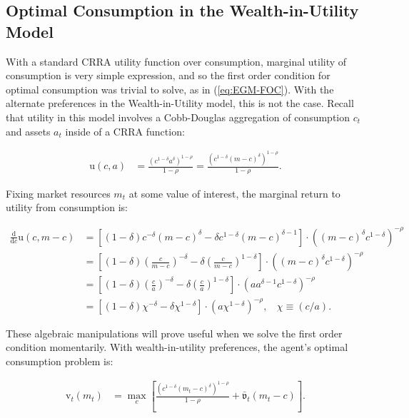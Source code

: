 \documentclass[12pt,letterpaper, fleqn]{article}
\newcommand{\CRRA}{\rho}
\newcommand{\uFunc}{\mathrm{u}}
\newcommand{\vFunc}{\mathrm{v}}
\newcommand{\cNrm}{c}
\newcommand{\mNrm}{m}
\newcommand{\aNrm}{a}
\begin{document}
\subsection{Optimal Consumption in the Wealth-in-Utility Model}

With a standard CRRA utility function over consumption, marginal utility of consumption is very simple expression, and so the first order condition for optimal consumption was trivial to solve, as in (\ref{eq:EGM-FOC}). With the alternate preferences in the Wealth-in-Utility model, this is not the case. Recall that utility in this model involves a Cobb-Douglas aggregation of consumption $\cNrm_t$ and assets $\aNrm_t$ inside of a CRRA function:

\begin{align}
    \uFunc(\cNrm, \aNrm) & = \frac{\left(\cNrm^{1-\delta}\aNrm^{\delta}\right)^{1-\CRRA}}{1-\CRRA} = \frac{\left(\cNrm^{1-\delta}(\mNrm - \cNrm)^{\delta}\right)^{1-\CRRA}}{1-\CRRA}.
\end{align}

Fixing market resources $\mNrm_t$ at some value of interest, the marginal return to utility from consumption is:

\begin{align}
\frac{\text{d}}{\text{d} \cNrm} \uFunc(\cNrm, \mNrm-\cNrm) &= \left[ (1-\delta) \cNrm^{-\delta} (\mNrm - \cNrm)^\delta - \delta \cNrm^{1-\delta}(\mNrm - \cNrm)^{\delta-1} \right] \cdot \left( (\mNrm - \cNrm)^\delta \cNrm^{1-\delta}  \right)^{-\CRRA} \nonumber\\
 &= \left[ (1-\delta) \left(\frac{\cNrm}{\mNrm-\cNrm}\right)^{-\delta} - \delta \left(\frac{\cNrm}{\mNrm - \cNrm} \right)^{1-\delta} \right] \cdot \left( (\mNrm - \cNrm)^\delta \cNrm^{1-\delta}  \right)^{-\CRRA} \nonumber\\
 &= \left[ (1-\delta) \left(\frac{\cNrm}{\aNrm}\right)^{-\delta} - \delta \left(\frac{\cNrm}{\aNrm} \right)^{1-\delta} \right] \cdot \left( \aNrm \aNrm^{\delta-1} \cNrm^{1-\delta}  \right)^{-\CRRA} \nonumber \\
 &= \left[ (1-\delta) \chi^{-\delta} - \delta \chi^{1-\delta} \right] \cdot \left( \aNrm \chi^{1-\delta}  \right)^{-\CRRA}, ~~~~ \chi \equiv (\cNrm/\aNrm).
\end{align}

These algebraic manipulations will prove useful when we solve the first order condition momentarily. With wealth-in-utility preferences, the agent's optimal consumption problem is:

\begin{align}
\vFunc_t(\mNrm_t) &= \max_\cNrm \left[ \frac{\left(\cNrm^{1-\delta}(\mNrm_t - \cNrm)^{\delta}\right)^{1-\CRRA}}{1-\CRRA} + \bar{\mathfrak{v}}_t(\mNrm_t - \cNrm) \right].
\end{align}
\end{document}
